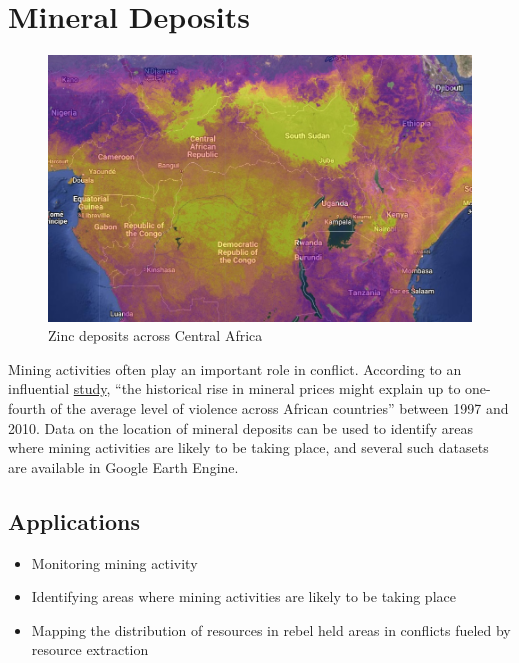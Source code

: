\documentclass[
  letterpaper,
  DIV=11,
  numbers=noendperiod]{scrreprt}
\providecommand{\tightlist}{%
  \setlength{\itemsep}{0pt}\setlength{\parskip}{0pt}}\usepackage{longtable,booktabs,array}
\begin{document}
\hypertarget{mineral-deposits}{%
\section{Mineral Deposits}\label{mineral-deposits}}

\begin{figure}

{\centering \includegraphics{././images/mining.jpg}

}

\caption{Zinc deposits across Central Africa}

\end{figure}

Mining activities often play an important role in conflict. According to
an influential
\href{https://www.aeaweb.org/articles?id=10.1257/aer.20150774}{study},
``the historical rise in mineral prices might explain up to one-fourth
of the average level of violence across African countries'' between 1997
and 2010. Data on the location of mineral deposits can be used to
identify areas where mining activities are likely to be taking place,
and several such datasets are available in Google Earth Engine.

\hypertarget{applications-4}{%
\subsection*{Applications}\label{applications-4}}

\begin{itemize}
\tightlist
\item
  Monitoring mining activity
\item
  Identifying areas where mining activities are likely to be taking
  place
\item
  Mapping the distribution of resources in rebel held areas in conflicts
  fueled by resource extraction
\end{itemize}
\end{document}
